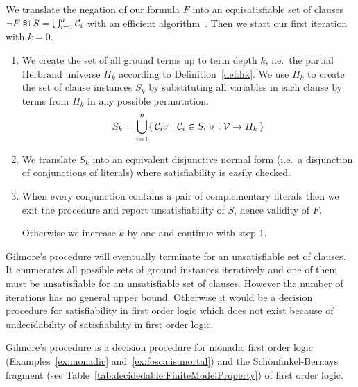 \begin{procedure}\label{proc:gilmore's:prover}
	We translate the negation of our formula \( F \) into an equisatisfiable set of clauses
	\( \lnot F \equisat S = \bigcup_{i=1}^{n} \mcC_i \) with an efficient algorithm~\cite{tseitin70, PLAISTED1986293}.
	Then we start our first iteration with \( k=0 \).
	\begin{enumerate}

		\item We create the set of all ground terms up to term depth \( k \),
		i.e.~the partial Herbrand universe \( H_k \) according to Definition~\ref{def:hk}.
		We use \( H_k \) to create the set of clause instances \( S_k \)
		by substituting all variables
		in each clause by terms from \( H_k \) in any possible permutation.
		\[ S_k = \bigcup_{i=1}^{n}
		 \{ \,
		\mathcal{C}_i\sigma \mid \mathcal{C}_i \in S, \, \sigma: \mathcal{V}\to H_k
		 \, \}
		\]

		\item We translate \( S_k \) into an equivalent disjunctive normal form
		(i.e.~a disjunction of conjunctions of literals)
		where satisfiability is easily checked.



		\item When every conjunction contains a pair of complementary literals
		then we exit the procedure and report unsatisfiability of \( S \),
		hence validity of \( F \).

		Otherwise we increase \( k \) by one and continue with step 1.
	\end{enumerate}
\end{procedure}

Gilmore's procedure will eventually terminate for an unsatisfiable set of clauses.
It enumerates all possible sets of ground instances iteratively
and one of them must be unsatisfiable for an unsatisfiable set of clauses.
However the number of iterations has no general upper bound.
Otherwise it would be a decision procedure for satisfiability in first order logic
which does not exist because of undecidability of satisfiability in first order logic.

\begin{lemma}
	Gilmore's procedure is a decision procedure for monadic first order logic
	(Examples~\ref{ex:monadic} and~\ref{ex:fosca:is:mortal})
	and the Schönfinkel-Bernays fragment
	(see Table~\ref{tab:decidedable:FiniteModelProperty})
	of first order logic.
\end{lemma}

